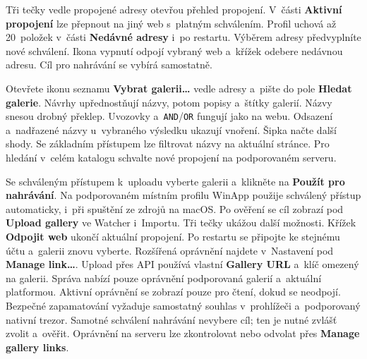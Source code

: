 \documentclass[11pt,a4paper]{article}
\newcommand{\ui}[1]{\textbf{#1}}
\begin{document}
Tři tečky vedle propojené adresy otevřou přehled propojení.
V~části \ui{Aktivní propojení} lze přepnout na jiný web s~platným
schválením. Profil uchová až 20~položek v~části \ui{Nedávné adresy}
i~po restartu. Výběrem adresy předvyplníte nové schválení.
Ikona vypnutí odpojí vybraný web a~křížek odebere nedávnou adresu.
Cíl pro nahrávání se vybírá samostatně.

Otevřete ikonu seznamu \ui{Vybrat galerii…} vedle adresy a~pište do pole
\ui{Hledat galerie}.
Návrhy upřednostňují názvy, potom popisy a~štítky galerií. Názvy snesou
drobný překlep. Uvozovky a~\texttt{AND}/\texttt{OR} fungují jako na webu.
Odsazení a~nadřazené názvy u~vybraného výsledku ukazují vnoření. Šipka načte
další shody. Se základním přístupem lze filtrovat názvy na aktuální stránce.
Pro hledání v~celém katalogu schvalte nové propojení na podporovaném serveru.

Se schváleným přístupem k~uploadu vyberte galerii a~klikněte na
\ui{Použít pro nahrávání}. Na
podporovaném místním profilu WinApp použije schválený přístup automaticky,
i~při spuštění ze zdrojů na macOS. Po ověření se cíl zobrazí pod \ui{Upload gallery}
ve Watcher i~Importu. Tři tečky ukážou další možnosti. Křížek
\ui{Odpojit web} ukončí aktuální propojení. Po restartu se připojte ke stejnému
účtu a~galerii znovu vyberte. Rozšířená oprávnění najdete v~Nastavení pod
\ui{Manage link…}. Upload přes API používá vlastní \ui{Gallery URL}
a~klíč omezený na galerii.
Správa nabízí pouze oprávnění podporovaná galerií a~aktuální platformou.
Aktivní oprávnění se zobrazí pouze pro čtení, dokud se neodpojí.
Bezpečné zapamatování vyžaduje samostatný souhlas v~prohlížeči a~podporovaný
nativní trezor. Samotné schválení nahrávání nevybere cíl; ten je nutné zvlášť
zvolit a~ověřit. Oprávnění na serveru lze zkontrolovat nebo odvolat přes
\ui{Manage gallery links}.
\end{document}
